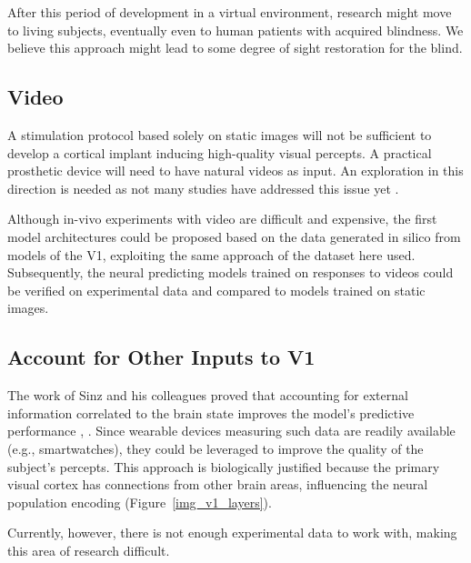 After this period of development in a virtual environment, research might move to living subjects, eventually even to human patients with acquired blindness. We believe this approach might lead to some degree of sight restoration for the blind.

\subsection*{Video}

A stimulation protocol based solely on static images will not be sufficient to develop a cortical implant inducing high-quality visual percepts. A practical prosthetic device will need to have natural videos as input. An exploration in this direction is needed as not many studies have addressed this issue yet \citep{sinz2018stimulus}.

Although in-vivo experiments with video are difficult and expensive, the first model architectures could be proposed based on the data generated in silico from models of the V1, exploiting the same approach of the dataset here used. Subsequently, the neural predicting models trained on responses to videos could be verified on experimental data and compared to models trained on static images.

\subsection*{Account for Other Inputs to V1}

The work of Sinz and his colleagues proved that accounting for external information correlated to the brain state improves the model’s predictive performance \citep{sinz2018stimulus}, \citep{bashiri2021flow}. Since wearable devices measuring such data are readily available (e.g., smartwatches), they could be leveraged to improve the quality of the subject’s percepts. This approach is biologically justified because the primary visual cortex has connections from other brain areas, influencing the neural population encoding (Figure~\ref{img_v1_layers}).

Currently, however, there is not enough experimental data to work with, making this area of research difficult.












